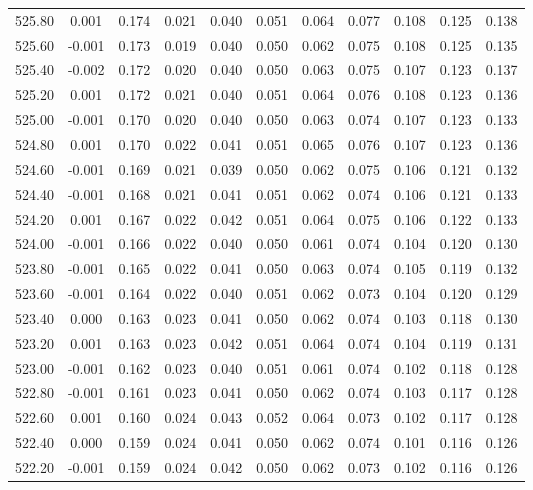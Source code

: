 \begin{longtable}{cccccccccc}
    525.80 &  0.001 &  0.174 &  0.021 &  0.040 &  0.051 &  0.064 &  0.077 &  0.108 &  0.125 &  0.138 \\
    525.60 & -0.001 &  0.173 &  0.019 &  0.040 &  0.050 &  0.062 &  0.075 &  0.108 &  0.125 &  0.135 \\
    525.40 & -0.002 &  0.172 &  0.020 &  0.040 &  0.050 &  0.063 &  0.075 &  0.107 &  0.123 &  0.137 \\
    525.20 &  0.001 &  0.172 &  0.021 &  0.040 &  0.051 &  0.064 &  0.076 &  0.108 &  0.123 &  0.136 \\
    525.00 & -0.001 &  0.170 &  0.020 &  0.040 &  0.050 &  0.063 &  0.074 &  0.107 &  0.123 &  0.133 \\
    524.80 &  0.001 &  0.170 &  0.022 &  0.041 &  0.051 &  0.065 &  0.076 &  0.107 &  0.123 &  0.136 \\
    524.60 & -0.001 &  0.169 &  0.021 &  0.039 &  0.050 &  0.062 &  0.075 &  0.106 &  0.121 &  0.132 \\
    524.40 & -0.001 &  0.168 &  0.021 &  0.041 &  0.051 &  0.062 &  0.074 &  0.106 &  0.121 &  0.133 \\
    524.20 &  0.001 &  0.167 &  0.022 &  0.042 &  0.051 &  0.064 &  0.075 &  0.106 &  0.122 &  0.133 \\
    524.00 & -0.001 &  0.166 &  0.022 &  0.040 &  0.050 &  0.061 &  0.074 &  0.104 &  0.120 &  0.130 \\
    523.80 & -0.001 &  0.165 &  0.022 &  0.041 &  0.050 &  0.063 &  0.074 &  0.105 &  0.119 &  0.132 \\
    523.60 & -0.001 &  0.164 &  0.022 &  0.040 &  0.051 &  0.062 &  0.073 &  0.104 &  0.120 &  0.129 \\
    523.40 &  0.000 &  0.163 &  0.023 &  0.041 &  0.050 &  0.062 &  0.074 &  0.103 &  0.118 &  0.130 \\
    523.20 &  0.001 &  0.163 &  0.023 &  0.042 &  0.051 &  0.064 &  0.074 &  0.104 &  0.119 &  0.131 \\
    523.00 & -0.001 &  0.162 &  0.023 &  0.040 &  0.051 &  0.061 &  0.074 &  0.102 &  0.118 &  0.128 \\
    522.80 & -0.001 &  0.161 &  0.023 &  0.041 &  0.050 &  0.062 &  0.074 &  0.103 &  0.117 &  0.128 \\
    522.60 &  0.001 &  0.160 &  0.024 &  0.043 &  0.052 &  0.064 &  0.073 &  0.102 &  0.117 &  0.128 \\
    522.40 &  0.000 &  0.159 &  0.024 &  0.041 &  0.050 &  0.062 &  0.074 &  0.101 &  0.116 &  0.126 \\
    522.20 & -0.001 &  0.159 &  0.024 &  0.042 &  0.050 &  0.062 &  0.073 &  0.102 &  0.116 &  0.126 \\

\end{longtable}
